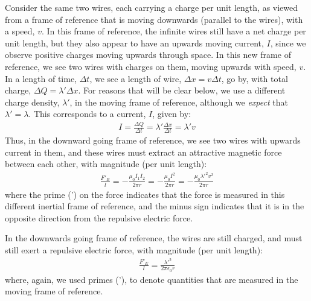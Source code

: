 Consider the same two wires, each carrying a charge per unit length, as viewed from a frame of reference that is moving downwards (parallel to the wires), with a speed, $v$. In this frame of reference, the infinite wires still have a net charge per unit length, but they also appear to have an upwards moving current, $I$, since we observe positive charges moving upwards through space.
In this new frame of reference, we see two wires with charges on them, moving upwards with speed, $v$. In a length of time, $\Delta t$, we see a length of wire, $\Delta x=v\Delta t$, go by, with total charge, $\Delta Q=\lambda' \Delta x$. For reasons that will be clear below, we use a different charge density, $\lambda'$, in the moving frame of reference, although we \textit{expect} that $\lambda'=\lambda$. This corresponds to a current, $I$, given by:
\begin{align*}
I=\frac{\Delta Q}{\Delta t}=\lambda'\frac{\Delta x}{\Delta t}=\lambda' v
\end{align*} 
Thus, in the downward going frame of reference, we see two wires with upwards current in them, and these wires must extract an attractive magnetic force between each other, with magnitude (per unit length):
\begin{align*}
\frac{F'_B}{l} = -\frac{\mu_0 I_1I_2}{2\pi r}=-\frac{\mu_0 I^2}{2\pi r}=-\frac{\mu_0 \lambda'^2 v^2}{2\pi r}
\end{align*}
where the prime (') on the force indicates that the force is measured in this different inertial frame of reference, and the minus sign indicates that it is in the opposite direction from the repulsive electric force. 

In the downwards going frame of reference, the wires are still charged, and must still exert a repulsive electric force, with magnitude (per unit length):
\begin{align*}
\frac{F'_E}{l}=\frac{\lambda'^2}{2\pi \epsilon_0r}
\end{align*}
where, again, we used primes ('), to denote quantities that are measured in the moving frame of reference.


